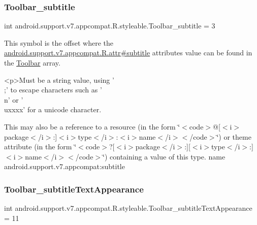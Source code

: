 \subsubsection{\texorpdfstring{Toolbar\+\_\+subtitle}{Toolbar\_subtitle}}
{\footnotesize\ttfamily int android.\+support.\+v7.\+appcompat.\+R.\+styleable.\+Toolbar\+\_\+subtitle = 3\hspace{0.3cm}{\ttfamily [static]}}

This symbol is the offset where the \hyperlink{classandroid_1_1support_1_1v7_1_1appcompat_1_1R_1_1attr_ab53f3a776c038849bb98b7bf21a4597f}{android.\+support.\+v7.\+appcompat.\+R.\+attr\#subtitle} attribute\textquotesingle{}s value can be found in the \hyperlink{classandroid_1_1support_1_1v7_1_1appcompat_1_1R_1_1styleable_a2daba9587ef9f700f2d54cf13435cb32}{Toolbar} array.

\begin{DoxyVerb}      <p>Must be a string value, using '\\;' to escape characters such as '\\n' or '\\uxxxx' for a unicode character.
\end{DoxyVerb}
 

This may also be a reference to a resource (in the form \char`\"{}$<$code$>$@\mbox{[}$<$i$>$package$<$/i$>$\+:\mbox{]}$<$i$>$type$<$/i$>$\+:$<$i$>$name$<$/i$>$$<$/code$>$\char`\"{}) or theme attribute (in the form \char`\"{}$<$code$>$?\mbox{[}$<$i$>$package$<$/i$>$\+:\mbox{]}\mbox{[}$<$i$>$type$<$/i$>$\+:\mbox{]}$<$i$>$name$<$/i$>$$<$/code$>$\char`\"{}) containing a value of this type.  name android.\+support.\+v7.\+appcompat\+:subtitle \mbox{\label{classandroid_1_1support_1_1v7_1_1appcompat_1_1R_1_1styleable_ad4f03da4f62ec7ae8eb42d3aafb404ef}} 
\subsubsection{\texorpdfstring{Toolbar\+\_\+subtitle\+Text\+Appearance}{Toolbar\_subtitleTextAppearance}}
{\footnotesize\ttfamily int android.\+support.\+v7.\+appcompat.\+R.\+styleable.\+Toolbar\+\_\+subtitle\+Text\+Appearance = 11\hspace{0.3cm}{\ttfamily [static]}}

